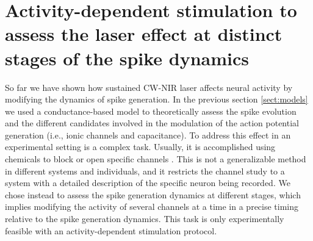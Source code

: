\section{Activity-dependent stimulation to assess the laser effect at distinct stages of the spike dynamics} 
\label{sec:activity dependent}
So far we have shown how sustained CW-NIR laser affects neural activity by modifying the dynamics of spike generation. In the previous section \ref{sect:models} we used a conductance-based model to theoretically assess the spike evolution and the different candidates involved in the modulation of the action potential generation (i.e., ionic channels and capacitance). To address this effect in an experimental setting is a complex task. Usually, it is accomplished using chemicals to block or open specific channels \cite{Liang2009}. This is not a generalizable method in different systems and individuals, and it restricts the channel study to a system with a detailed description of the specific neuron being recorded. We chose instead to assess the spike generation dynamics at different stages, which implies modifying the activity of several channels at a time in a precise timing relative to the spike generation dynamics. This task is only experimentally feasible with an activity-dependent stimulation protocol.
